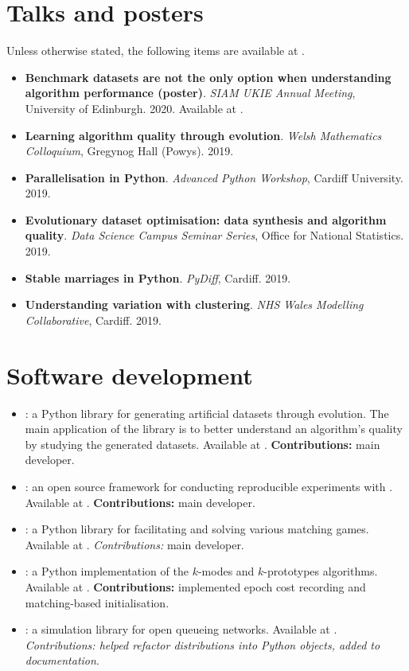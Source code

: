 \section*{Talks and posters}

Unless otherwise stated, the following items are available at
.

\begin{itemize}
    \item \textbf{Benchmark datasets are not the only option when understanding
        algorithm performance (poster)}. \emph{SIAM UKIE Annual Meeting},
        University of Edinburgh. 2020. Available at
        . 
    \item \textbf{Learning algorithm quality through evolution}. \emph{Welsh
        Mathematics Colloquium}, Gregynog Hall (Powys). 2019.
    \item \textbf{Parallelisation in Python}. \emph{Advanced Python Workshop},
        Cardiff University. 2019.
    \item \textbf{Evolutionary dataset optimisation: data synthesis and
        algorithm quality}. \emph{Data Science Campus Seminar Series}, Office
        for National Statistics. 2019.
    \item \textbf{Stable marriages in Python}. \emph{PyDiff}, Cardiff. 2019.
    \item \textbf{Understanding variation with clustering}. \emph{NHS Wales
        Modelling Collaborative}, Cardiff. 2019.
\end{itemize}

\section*{Software development}

\begin{itemize}
    \item \edo: a Python library for generating artificial datasets through
        evolution. The main application of the library is to better understand
        an algorithm's quality by studying the generated datasets. Available
        at . \textbf{Contributions:} main developer.
    \item \edolab: an open source framework for conducting reproducible
        experiments with \edo. Available at .
        \textbf{Contributions:} main developer.
    \item \matching: a Python library for facilitating and solving various
        matching games. Available at .
        \emph{Contributions:} main developer.
    \item \kmodes: a Python implementation of the \(k\)-modes and
        \(k\)-prototypes algorithms. Available at .
        \textbf{Contributions:} implemented epoch cost recording and matching-based
        initialisation.
    \item \ciw: a simulation library for open queueing networks. Available at
        . \emph{Contributions: helped refactor
        distributions into Python objects, added to documentation}.
\end{itemize}
